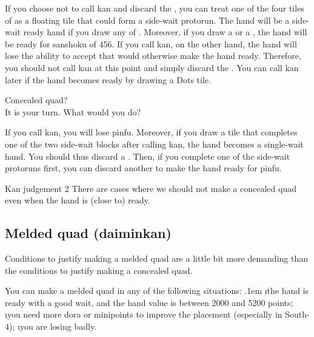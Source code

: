 \bigskip
If you choose not to call {\jap kan} and discard the {\large{}}, you can treat one of the four tiles of {\large{}} as a floating tile that could form a side-wait protorun. The hand will be a side-wait ready hand if you draw any of {\large{}}. Moreover, if you draw a {\large{}} or a {\large{}}, the hand will be ready for {\jap sanshoku} of 456. 
If you call {\jap kan}, on the other hand, the hand will lose the ability to accept {\large{}} that would otherwise make the hand ready.
Therefore, you should not call {\jap kan} at this point and simply discard the {\large{}}. You can call {\jap kan} later if the hand becomes ready by drawing a Dots tile.

\bigskip
\begin{itembox}[r]{Concealed quad?}
\bp
{}\\
\ep
\vspace{-10pt}It is your turn. What would you do?
\end{itembox}
\noindent
If you call {\jap kan}, you will lose {\jap pinfu}. Moreover, if you draw a tile that completes one of the two side-wait blocks after calling {\jap kan}, the hand becomes a single-wait hand. You should thus discard a {\large{}}. Then, if you complete one of the side-wait protoruns first, you can discard another {\large{}} to make the hand ready for {\jap pinfu}. 

\bigskip
\begin{itembox}[c]{{\jap Kan} judgement 2}
There are cases where we should not make a concealed quad even when the hand is (close to) ready.
\end{itembox}


\subsection{Melded quad ({\jap daiminkan})}
Conditions to justify making a melded quad are a little bit more demanding than the conditions to justify making a concealed quad. 

\bigskip
You can make a melded quad in any of the following situations:
\bi \itemsep.1em
\i the hand is ready with a good wait, and the hand value is between 2000 and 5200 points;
\i you need more {\jap dora} or minipoints to improve the placement (especially in South-4);
\i you are losing badly.
\ei

